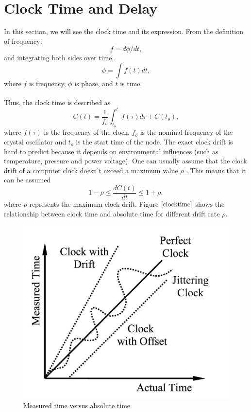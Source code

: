 \documentclass[a4paper,10pt]{report}
\begin{document}
\section{\textbf{Clock Time and Delay}}
In this section, we will see the clock time and its expression. From the definition of frequency:
\begin{equation}
f = d\phi/dt \label{freq_defn} ,
\end{equation}
and integrating both sides over time,
 \begin{equation}
\phi =\int f(t)dt ,
 \end{equation}
where $f$ is frequency, $\phi$ is phase, and $t$ is time.\paragraph*{}
Thus, the clock time is described as
\begin{equation}
C(t) = \frac{1}{f_o}\int_{t_o}^{t} {f(\tau)d\tau} + C(t_o) ,
\label{clock}
\end{equation}
where $f(\tau)$ is the frequency of the clock, $f_o$ is the nominal frequency of the crystal oscillator and $t_o$ is the start time of
the node. The exact clock drift is hard to predict because it depends on environmental influences (such as temperature, pressure
and power voltage). One can usually assume that the clock drift of a computer clock doesn't exceed a maximum value $\rho$ . This means
that it can be assumed
\begin{equation}
1-\rho \leq \frac{dC(t)}{dt} \leq 1+\rho ,
\end{equation}
where $\rho$ represents the maximum clock drift. Figure $\ref{clocktime}$ shows the relationship between clock time and absolute time for different drift rate $\rho$.
\begin{figure}
\centering
\includegraphics[width=0.5 \textwidth]{actualvsmeasuredtime}
\caption{Measured time versus absolute time} \label{clocktime}
\end{figure}
\end{document}
